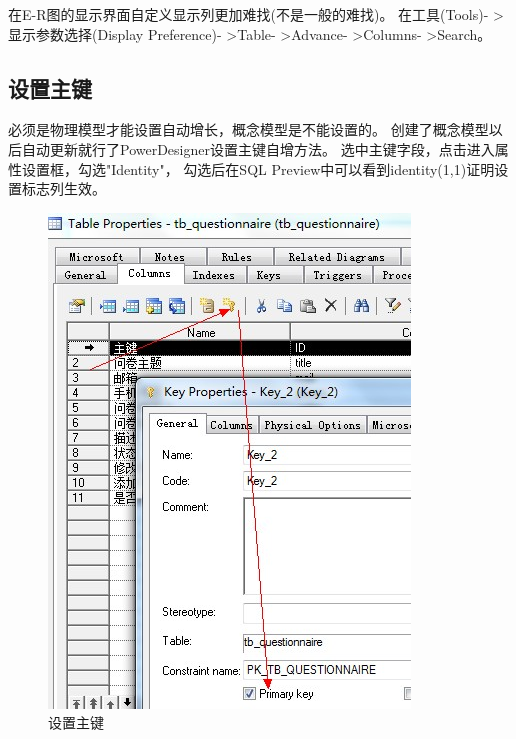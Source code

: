 \documentclass{book}
\begin{document}
在E-R图的显示界面自定义显示列更加难找(不是一般的难找)。
在工具(Tools)- >显示参数选择(Display Preference)- >Table- >Advance- >Columns- >Search。

\subsection{设置主键}

必须是物理模型才能设置自动增长，概念模型是不能设置的。
创建了概念模型以后自动更新就行了PowerDesigner设置主键自增方法。
选中主键字段，点击进入属性设置框，勾选"Identity"，
勾选后在SQL Preview中可以看到identity(1,1)证明设置标志列生效。

\begin{figure}[htbp]
	\centering
	\includegraphics[scale=0.8]{PDSetPrimaryKey.jpg}
	\caption{设置主键}
	\label{fig:PDSetPrimaryKey}
\end{figure}
\end{document}
